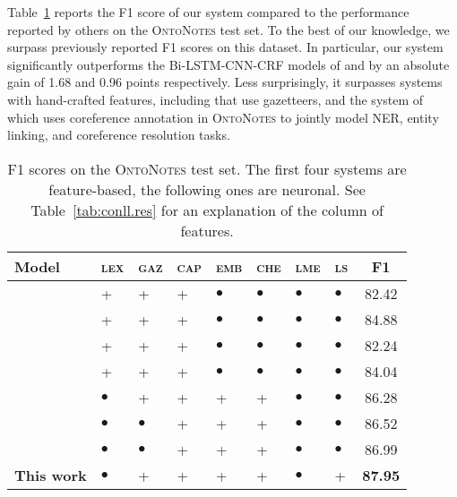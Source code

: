 \documentclass[11pt]{article}
\newcommand{\onto}{\textsc{OntoNotes}}
\newcommand{\lll}{\textsc{lex}}
\newcommand{\ggg}{\textsc{gaz}}
\newcommand{\ccc}{\textsc{cap}}
\newcommand{\chhh}{\textsc{che}}
\newcommand{\eee}{\textsc{emb}}
\newcommand{\mmm}{\textsc{lme}}
\newcommand{\sss}{\textsc{ls}}
\begin{document}
	Table~\ref{tab:onto.res} reports the F1 score of our system compared to the performance reported by others on the \onto{} test set. To the best of our knowledge, we surpass previously reported F1 scores on this dataset. In particular, our system significantly outperforms the Bi-LSTM-CNN-CRF  models of \cite{chiu2015named} and \cite{strubell2017fast} by an absolute gain of 1.68 and 0.96 points respectively.  Less surprisingly, it surpasses systems with hand-crafted features, including  that use gazetteers, and the system of  which uses coreference annotation in \onto{} to jointly model NER, entity linking, and coreference resolution tasks. 
	
	
	\begin{table}[h]
		
		\begin{center}
\setlength{\tabcolsep}{1mm}  
			\begin{tabular}{|l|lllllll|c|}
				\hline \textbf{Model} & \lll & \ggg & \ccc &\eee & \chhh & \mmm & \sss & \textbf{F1} \\ 
				\hline
				\cite{finkel2009joint} 						& \textsc{+}& \textsc{+}& \textsc{+} & $\bullet$&$\bullet$&$\bullet$&$\bullet$	& 82.42 \\
				\cite{ratinov2009design}  		& \textsc{+}& \textsc{+}& \textsc{+} & $\bullet$&$\bullet$&$\bullet$&$\bullet$	& 84.88 \\
				\cite{passos2014lexicon} 				        & \textsc{+}& \textsc{+}& \textsc{+} & $\bullet$&$\bullet$&$\bullet$&$\bullet$	& 82.24 \\
				\cite{durrett2014joint} 					& \textsc{+}& \textsc{+}& \textsc{+} & $\bullet$&$\bullet$&$\bullet$&$\bullet$	& 84.04 \\
				\hline 
				\cite{chiu2015named} & $\bullet$ & \textsc{+}& \textsc{+}& \textsc{+} & \textsc{+} &$\bullet$&$\bullet$	& 86.28 \\
				\cite{shen2017deep} & $\bullet$&$\bullet$ & \textsc{+}& \textsc{+}& \textsc{+} & $\bullet$ & $\bullet$	& 86.52 \\
				\cite{strubell2017fast} & $\bullet$&$\bullet$ & \textsc{+}& \textsc{+}& \textsc{+} & $\bullet$ & $\bullet$	& 86.99 \\
				
				\hline
				\textbf{This work} 	& $\bullet$& \textsc{+}& \textsc{+} & \textsc{+}& \textsc{+} & $\bullet$ 	& \textsc{+}	& \bf 87.95 \\
				\hline
			\end{tabular}
					\end{center}
		
		
		\caption{F1 scores on the \onto{} test set. The first four systems are feature-based, the following ones are neuronal. See Table~\ref{tab:conll.res} for an explanation of the column of features.}
		\label{tab:onto.res} 
		
	\end{table}
\end{document}
